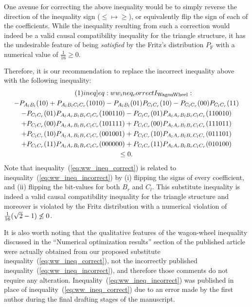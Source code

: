 \documentclass[aps, 10pt, english, twoside, pra, nofootinbib, tightenlines, longbibliography, superscriptaddress, notitlepage]{revtex4-1}
\begin{document}
    One avenue for correcting the above inequality would be to simply reverse the direction of the inequality sign ($\leq \mapsto \geq$), or equivalently flip the sign of each of the coefficients. While the inequality resulting from such a correction would indeed be a valid causal compatibility inequality for the triangle structure, it has the undesirable feature of being \textit{satisfied} by the Fritz's distribution $P_{\text{F}}$ with a numerical value of $\frac{1}{16} \geq 0$.

    Therefore, it is our recommendation to replace the incorrect inequality above with the following inequality:
    \begin{equation*}
    \begin{gathered}
        \eq\label[ineq]{eq:ww_ineq_correct}
        I\tsb{WagonWheel} : \\
        -P_{A_{l}B_{l}}(10)
        +P_{A_{l}B_{l}C_{l}C_{r}}(1010)
        -P_{A_{l}B_{l}}(01) P_{C_{l}C_{r}}(10)
        -P_{C_{l}C_{r}}(00) P_{C_{l}C_{r}}(11) \\
        -P_{C_{l}C_{r}}(01) P_{A_{l}A_{r}B_{l}B_{r}C_{l}C_{r}}(100110)
        -P_{C_{l}C_{r}}(01) P_{A_{l}A_{r}B_{l}B_{r}C_{l}C_{r}}(110010) \\
        +P_{C_{l}C_{r}}(00) P_{A_{l}A_{r}B_{l}B_{r}C_{l}C_{r}}(101111)
        +P_{C_{l}C_{r}}(00) P_{A_{l}A_{r}B_{l}B_{r}C_{l}C_{r}}(111011) \\
        +P_{C_{l}C_{r}}(10) P_{A_{l}A_{r}B_{l}B_{r}C_{l}C_{r}}(001001)
        +P_{C_{l}C_{r}}(10) P_{A_{l}A_{r}B_{l}B_{r}C_{l}C_{r}}(011101) \\
        +P_{C_{l}C_{r}}(11) P_{A_{l}A_{r}B_{l}B_{r}C_{l}C_{r}}(000000)
        +P_{C_{l}C_{r}}(11) P_{A_{l}A_{r}B_{l}B_{r}C_{l}C_{r}}(010100) \\
        \leq 0.
    \end{gathered}
    \end{equation*}
    Note that inequality~(\ref{eq:ww_ineq_correct}) is related to inequality~(\ref{eq:ww_ineq_incorrect}) by (i) flipping the signs of every coefficient, and (ii) flipping the bit-values for both $B_r$ and $C_l$. This substitute inequality is indeed a valid causal compatibility inequality for the triangle structure and moreover is violated by the Fritz distribution with a numerical violation of $\frac{1}{16}(\sqrt{2} - 1) \not \leq 0$. 
    
    It is also worth noting that the qualitative features of the wagon-wheel inequality discussed in the ``Numerical optimization results'' section of the published article were actually obtained from our proposed substitute inequality~(\ref{eq:ww_ineq_correct}), not the incorrectly published inequality~(\ref{eq:ww_ineq_incorrect}), and therefore those comments do not require any alteration. Inequality~(\ref{eq:ww_ineq_incorrect}) was published in place of inequality~(\ref{eq:ww_ineq_correct}) due to an error made by the first author during the final drafting stages of the manuscript.
\end{document}
